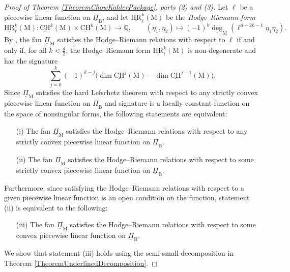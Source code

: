 \documentclass[11pt,reqno]{amsart}
\theoremstyle{definition}
\theoremstyle{remark}
\renewcommand{\dim}{\operatorname{dim}}
\renewcommand{\(}{\left(}
\renewcommand{\)}{\right)}
\newcommand{\<}{\left<}
\renewcommand{\>}{\right>}
\begin{document}
\begin{proof}[Proof of Theorem \ref{TheoremChowKahlerPackage}, parts (2) and (3)]
Let $\ell$ be a piecewise linear function on $\underline{\Pi}_\mathrm{B}$, and let $\underline{\mathrm{HR}}_\ell^k(\mathrm{M})$ be the \emph{Hodge--Riemann form} 
\[
\underline{\mathrm{HR}}_\ell^k(\mathrm{M}): \underline{\mathrm{CH}}^k(\mathrm{M}) \times \underline{\mathrm{CH}}^k(\mathrm{M}) \longrightarrow \mathbb{Q}, \qquad (\eta_1,\eta_2) \longmapsto (-1)^k\underline{\deg}_\mathrm{M}(\ell^{d-2k-1}\eta_1\eta_2).
\]
By \cite[Proposition 7.6]{AHK}, the fan $\underline{\Pi}_\mathrm{M}$ satisfies the Hodge--Riemann relations with respect to $\ell$ 
if and only if, for all $k < \frac{d}{2}$,
the Hodge--Riemann form $\underline{\mathrm{HR}}_\ell^k(\mathrm{M})$ is non-degenerate and has the signature
\[
\sum_{j=0}^k (-1)^{k-j}\Big( \dim \underline{\mathrm{CH}}^j(\mathrm{M}) - \dim \underline{\mathrm{CH}}^{j-1}(\mathrm{M}) \Big).
\]
Since  $\underline{\Pi}_\mathrm{M}$ satisfies the hard Lefschetz theorem with respect to any strictly convex piecewise linear function on 
$\underline{\Pi}_\mathrm{B}$ and signature is a locally constant function on the space of nonsingular forms,
the following statements are equivalent:
\begin{enumerate}[(1)]\itemsep 5pt
\item[(i)] The fan $\underline{\Pi}_\mathrm{M}$ satisfies the Hodge--Riemann relations with respect to any strictly convex piecewise linear function on $\underline{\Pi}_\mathrm{B}$.
\item[(ii)] The fan $\underline{\Pi}_\mathrm{M}$ satisfies the Hodge--Riemann relations with respect to some strictly convex piecewise linear function on $\underline{\Pi}_\mathrm{B}$.
\end{enumerate}
Furthermore, since satisfying the Hodge--Riemann relations with respect to a given piecewise
linear function is an open condition on the function, statement (ii) is equivalent to the following:
\begin{enumerate}[(1)]\itemsep 5pt
\item[(iii)] The fan $\underline{\Pi}_\mathrm{M}$ satisfies the Hodge--Riemann relations with respect to some convex piecewise linear function on $\underline{\Pi}_\mathrm{B}$.
\end{enumerate}
We show that statement (iii) holds using the semi-small decomposition in Theorem \ref{TheoremUnderlinedDecomposition}.


\end{proof}
\end{document}
